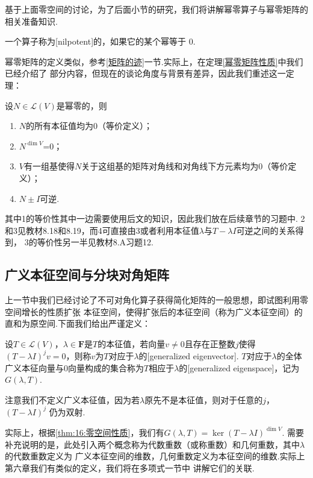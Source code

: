 基于上面零空间的讨论，为了后面小节的研究，我们将讲解幂零算子与幂零矩阵的相关准备知识.
\begin{definition}
    一个算子称为[nilpotent]的，如果它的某个幂等于 0.
\end{definition}
幂零矩阵的定义类似，参考\ref{矩阵的迹}一节.实际上，在定理\ref{幂零矩阵性质}中我们已经介绍了
部分内容，但现在的谈论角度与背景有差异，因此我们重述这一定理：
\begin{theorem} \label{thm:16:幂零算子性质}
    设$N\in \mathcal{L}(V)$是幂零的，则
    \begin{enumerate}
        \item $N$的所有本征值均为0（等价定义）；

        \item $N^{\dim V}$=0；

        \item $V$有一组基使得$N$关于这组基的矩阵对角线和对角线下方元素均为0（等价定义）；

        \item $N\pm I$可逆.
    \end{enumerate}
\end{theorem}
其中1的等价性其中一边需要使用后文的知识，因此我们放在后续章节的习题中.
2和3见教材8.18和8.19，而4可直接由3或者利用本征值$\lambda$与$T-\lambda I$可逆之间的关系得到，
3的等价性另一半见教材8.A习题12.

\subsection{广义本征空间与分块对角矩阵}
上一节中我们已经讨论了不可对角化算子获得简化矩阵的一般思想，即试图利用零空间增长的性质扩张
本征空间，使得扩张后的本征空间（称为广义本征空间）的直和为原空间.下面我们给出严谨定义：
\begin{definition}
    设$T\in \mathcal{L}(V)$，$\lambda\in\mathbf{F}$是$T$的本征值，若向量$v\neq 0$且存在正整数$j$使得
    $(T-\lambda I)^jv=0$，则称$v$为$T$对应于$\lambda$的[generalized eigenvector].
    $T$对应于$\lambda$的全体广义本征向量与0向量构成的集合称为$T$相应于$\lambda$的[generalized eigenspace]，记为$G(\lambda,T)$.
\end{definition}
注意我们不定义广义本征值，因为若$\lambda$原先不是本征值，则对于任意的$j$，$(T-\lambda I)^j$
仍为双射.

实际上，根据\autoref{thm:16:零空间性质}，我们有$G(\lambda,T)=\ker (T-\lambda I)^{\dim V}$.
需要补充说明的是，此处引入两个概念称为代数重数（或称重数）和几何重数，其中$\lambda$的代数重数定义为
广义本征空间的维数，几何重数定义为本征空间的维数.实际上第六章我们有类似的定义，我们将在多项式一节中
讲解它们的关联.

